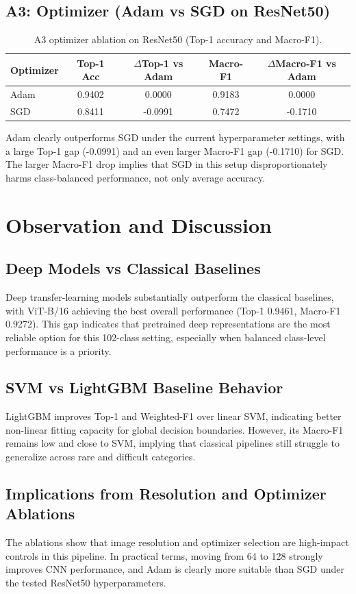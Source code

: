 \documentclass[11pt]{article}
\begin{document}
\subsection{A3: Optimizer (Adam vs SGD on ResNet50)}
\begin{table}[H]
\centering
\caption{A3 optimizer ablation on ResNet50 (Top-1 accuracy and Macro-F1).}
\begin{tabular}{lcccc}
\toprule
Optimizer & Top-1 Acc & $\Delta$Top-1 vs Adam & Macro-F1 & $\Delta$Macro-F1 vs Adam \\
\midrule
Adam & 0.9402 & 0.0000 & 0.9183 & 0.0000 \\
SGD & 0.8411 & -0.0991 & 0.7472 & -0.1710 \\
\bottomrule
\end{tabular}
\end{table}
Adam clearly outperforms SGD under the current hyperparameter settings, with a large Top-1 gap (-0.0991) and an even larger Macro-F1 gap (-0.1710) for SGD. The larger Macro-F1 drop implies that SGD in this setup disproportionately harms class-balanced performance, not only average accuracy.

\section{Observation and Discussion}
\subsection{Deep Models vs Classical Baselines}
Deep transfer-learning models substantially outperform the classical baselines, with ViT-B/16 achieving the best overall performance (Top-1 0.9461, Macro-F1 0.9272). This gap indicates that pretrained deep representations are the most reliable option for this 102-class setting, especially when balanced class-level performance is a priority.

\subsection{SVM vs LightGBM Baseline Behavior}
LightGBM improves Top-1 and Weighted-F1 over linear SVM, indicating better non-linear fitting capacity for global decision boundaries. However, its Macro-F1 remains low and close to SVM, implying that classical pipelines still struggle to generalize across rare and difficult categories.

\subsection{Implications from Resolution and Optimizer Ablations}
The ablations show that image resolution and optimizer selection are high-impact controls in this pipeline. In practical terms, moving from 64 to 128 strongly improves CNN performance, and Adam is clearly more suitable than SGD under the tested ResNet50 hyperparameters.
\end{document}
